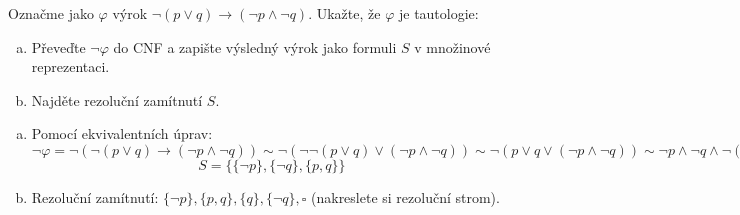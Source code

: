 \begin{problem}

    Označme jako $\varphi$ výrok $\neg (p \vee q) \to (\neg p \wedge \neg q)$. Ukažte, že $\varphi$ je tautologie:
    \begin{enumerate}[(a)]
        \item Převeďte $\neg \varphi$ do CNF a zapište výsledný výrok jako formuli $S$ v množinové reprezentaci.
        \item Najděte rezoluční zamítnutí $S$.
    \end{enumerate}

    \begin{solution}

        \begin{enumerate}[(a)]
            \item Pomocí ekvivalentních úprav: $\neg\varphi=\neg(\neg (p \vee q) \to (\neg p \wedge \neg q))\sim\neg(\neg \neg (p \vee q) \lor (\neg p \wedge \neg q))\sim\neg(p \vee q \vee (\neg p \wedge \neg q))\sim \neg p \land \neg q \land  \neg (\neg p \wedge \neg q)\sim\neg p \land \neg q \land  (p \lor q)$
            $$
            S = \{\{\neg p\},\{\neg q\},\{p,q\}\}
            $$
            \item Rezoluční zamítnutí: $\{\neg p\},\{p,q\},\{q\},\{\neg q\},\square$ (nakreslete si rezoluční strom).
        \end{enumerate}
                    
    \end{solution}

\end{problem}


